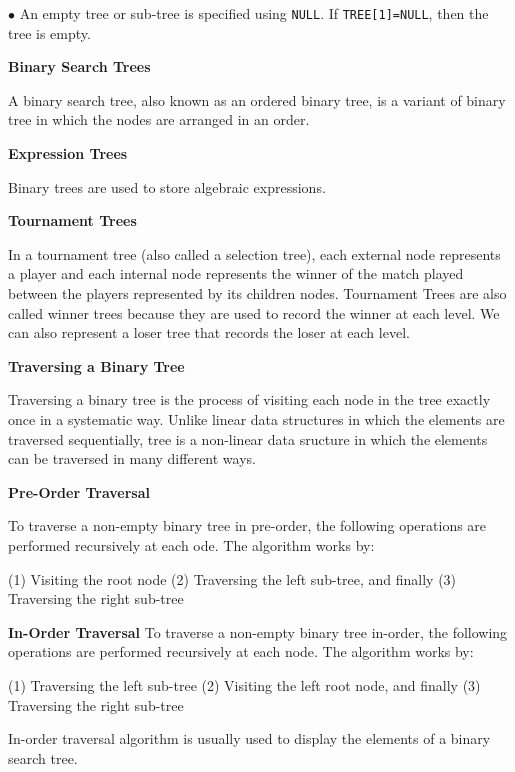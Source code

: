 \vskip 1mm
\qquad$\bullet$ An empty tree or sub-tree is specified using {\tt NULL}. If {\tt TREE[1]=NULL}, then the tree is empty.

\filbreak
\vskip 1cm
{\bf Binary Search Trees}

\vskip 3mm
A binary search tree, also known as an ordered binary tree, is a variant of binary tree in which the nodes are arranged in an order.

\filbreak
\vskip 1cm
{\bf Expression Trees}

\vskip 3mm
Binary trees are used to store algebraic expressions.

\filbreak
\vskip 1cm
{\bf Tournament Trees}

\vskip 1mm
In a tournament tree (also called a selection tree), each external node represents a player and each internal node represents the winner of the match played between the players represented by its children nodes. Tournament Trees are also called winner trees because they are used to record the winner at each level. We can also represent a loser tree that records the loser at each level.

\filbreak
\vskip 1cm
{\bf Traversing a Binary Tree}

\vskip 1mm
Traversing a binary tree is the process of visiting each node in the tree exactly once in a systematic way. Unlike linear data structures in which the elements are traversed sequentially, tree is a non-linear data sructure in which the elements can be traversed in many different ways.

\vskip 3mm
{\bf Pre-Order Traversal}

\vskip 1mm
To traverse a non-empty binary tree in pre-order, the following operations are performed recursively at each ode. The algorithm works by:

\qquad(1) Visiting the root node
\vskip 1mm
\qquad(2) Traversing the left sub-tree, and finally
\vskip 1mm
\qquad(3) Traversing the right sub-tree

\vskip 3mm
{\bf In-Order Traversal}
\vskip 1mm
To traverse a non-empty binary tree in-order, the following operations are performed recursively at each node. The algorithm works by:

\vskip 1mm
\qquad(1) Traversing the left sub-tree
\vskip 1mm
\qquad(2) Visiting the left root node, and finally
\vskip 1mm
\qquad(3) Traversing the right sub-tree

\vskip 1mm
In-order traversal algorithm is usually used to display the elements of a binary search tree.

